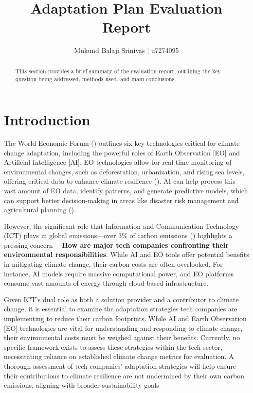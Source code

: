 \documentclass[12pt]{article}
\title{Adaptation Plan Evaluation Report}
\author{Mukund Balaji Srinivas | u7274095}
\date{} %
\begin{document}
\maketitle

\begin{abstract}
This section provides a brief summary of the evaluation report, outlining the key question being addressed, methods used, and main conclusions.
\end{abstract}

\newpage

\section*{Introduction}
The World Economic Forum (\cite{masterson_2024})  outlines six key technologies critical for climate change adaptation, including the powerful roles of Earth Observation [EO] and Artificial Intelligence [AI]. EO technologies allow for real-time monitoring of environmental changes, such as deforestation, urbanization, and rising sea levels, offering critical data to enhance climate resilience (\cite{anderson_2017}). AI can help process this vast amount of EO data, identify patterns, and generate predictive models, which can support better decision-making in areas like disaster risk management and agricultural planning (\cite{Huntingford_2019}).

However, the significant role that Information and Communication Technology (ICT) plays in global emissions—over 3\% of carbon emissions (\cite{jones_2018}) highlights a pressing concern— \textbf{How are major tech companies confronting their environmental responsibilities}. While AI and EO tools offer potential benefits in mitigating climate change, their carbon costs are often overlooked. For instance, AI models require massive computational power, and EO platforms consume vast amounts of energy through cloud-based infrastructure.

Given ICT's dual role as both a solution provider and a contributor to climate change, it is essential to examine the adaptation strategies tech companies are implementing to reduce their carbon footprints. While AI and Earth Observation [EO] technologies are vital for understanding and responding to climate change, their environmental costs must be weighed against their benefits. Currently, no specific framework exists to assess these strategies within the tech sector, necessitating reliance on established climate change metrics for evaluation. A thorough assessment of tech companies' adaptation strategies will help ensure their contributions to climate resilience are not undermined by their own carbon emissions, aligning with broader sustainability goals
\end{document}
